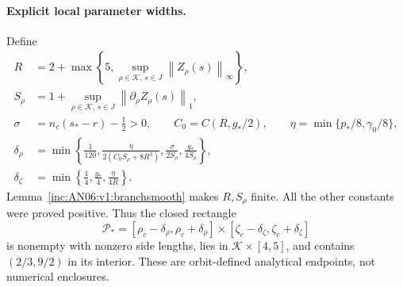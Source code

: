\documentclass[11pt]{article}
\numberwithin{equation}{section}
\theoremstyle{remark}\newtheorem{remark}[theorem]{Remark}
\newcommand{\1}{\mathbf 1}
\newcommand{\norm}[1]{\left\lVert#1\right\rVert}
\begin{document}
\paragraph{Explicit local parameter widths.}
Define
\begin{align}
 R&=2+\max\left\{5,\sup_{\rho\in\mathcal K,\,s\in J}
                  \norm{Z_\rho(s)}_\infty\right\},\nonumber\\
 S_\rho&=1+\sup_{\rho\in\mathcal K,\,s\in J}
                  \norm{\partial_\rho Z_\rho(s)}_1,\nonumber\\
 \sigma&=n_c(s_*-r)-\tfrac12>0,\qquad
 C_0=C(R,g_*/2),\qquad \eta=\min\{p_*/8,\gamma_0/8\},
 \label{inc:AN06:v1:constants}\\
 \delta_\rho&=\min\left\{\frac1{120},
   \frac{\eta}{2(C_0S_\rho+8R^3)},
   \frac{\sigma}{2S_\rho},\frac{g_*}{4S_\rho}\right\},\nonumber\\
 \delta_\zeta&=\min\left\{\frac14,\frac{g_*}{4},\frac{\eta}{4R}\right\}.
 \nonumber
\end{align}
Lemma~\ref{inc:AN06:v1:branchsmooth} makes $R,S_\rho$ finite. All the
other constants were proved positive. Thus the closed rectangle
\begin{equation}\label{inc:AN06:v1:rectangle}
 \mathcal P_*=[\rho_c-\delta_\rho,\rho_c+\delta_\rho]
 \times[\zeta_c-\delta_\zeta,\zeta_c+\delta_\zeta]
\end{equation}
is nonempty with nonzero side lengths, lies in $\mathcal K\times[4,5]$,
and contains $(2/3,9/2)$ in its interior.
These are orbit-defined analytical endpoints, not numerical enclosures.
\end{document}
